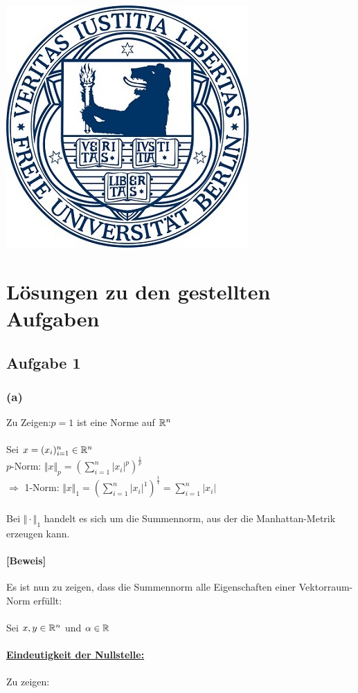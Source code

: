 \documentclass{llncs}
\begin{document}
\maketitle

\begin{center}
\includegraphics{fubsiegel.jpg}
\end{center}

\chapter*{L\"osungen zu den gestellten Aufgaben}

\section*{Aufgabe 1}

\subsection*{(a)}
Zu Zeigen:$p=1$ ist eine Norme auf $\mathbb{R}^n$\\\\
Sei $x=(x_i)^n_{i=1}\in \mathbb{R}^n$\\
$p$-Norm: $\Vert x\Vert_p=\left( \sum^n_{i=1} |x_i|^p\right)^{\frac{1}{p}}$\\
$\Rightarrow$ 1-Norm: $\Vert x\Vert_1=\left( \sum^n_{i=1} |x_i|^1\right)^{\frac{1}{1}}=\sum^n_{i=1} |x_i|$\\\\
Bei $\Vert\cdot\Vert_1$ handelt es sich um die Summennorm, aus der die Manhattan-Metrik erzeugen kann.
\subsubsection*{[Beweis]\\}
Es ist nun zu zeigen, dass die Summennorm alle Eigenschaften einer Vektorraum-Norm erfüllt:\\\\
Sei $x,y\in \mathbb{R}^n$ und $\alpha \in \mathbb{R}$\\\\
\underline{\textbf{Eindeutigkeit der Nullstelle:}}\\\\
Zu zeigen:
\end{document}
